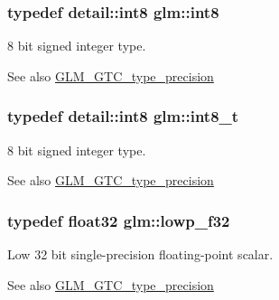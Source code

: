 \subsubsection[{\texorpdfstring{int8}{int8}}]{\setlength{\rightskip}{0pt plus 5cm}typedef detail\+::int8 {\bf glm\+::int8}}\hypertarget{group__gtc__type__precision_ga96254f9c1c4506fc8eb5cf3301ce8565}{}\label{group__gtc__type__precision_ga96254f9c1c4506fc8eb5cf3301ce8565}
8 bit signed integer type. \begin{DoxySeeAlso}{See also}
\hyperlink{group__gtc__type__precision}{G\+L\+M\+\_\+\+G\+T\+C\+\_\+type\+\_\+precision} 
\end{DoxySeeAlso}
\subsubsection[{\texorpdfstring{int8\+\_\+t}{int8_t}}]{\setlength{\rightskip}{0pt plus 5cm}typedef detail\+::int8 {\bf glm\+::int8\+\_\+t}}\hypertarget{group__gtc__type__precision_ga673898d450b2a91186f3c4f40c5f8633}{}\label{group__gtc__type__precision_ga673898d450b2a91186f3c4f40c5f8633}
8 bit signed integer type. \begin{DoxySeeAlso}{See also}
\hyperlink{group__gtc__type__precision}{G\+L\+M\+\_\+\+G\+T\+C\+\_\+type\+\_\+precision} 
\end{DoxySeeAlso}
\subsubsection[{\texorpdfstring{lowp\+\_\+f32}{lowp_f32}}]{\setlength{\rightskip}{0pt plus 5cm}typedef float32 {\bf glm\+::lowp\+\_\+f32}}\hypertarget{group__gtc__type__precision_ga1b9734de4b4429dc26b1454a2a399b05}{}\label{group__gtc__type__precision_ga1b9734de4b4429dc26b1454a2a399b05}
Low 32 bit single-\/precision floating-\/point scalar. \begin{DoxySeeAlso}{See also}
\hyperlink{group__gtc__type__precision}{G\+L\+M\+\_\+\+G\+T\+C\+\_\+type\+\_\+precision} 
\end{DoxySeeAlso}
